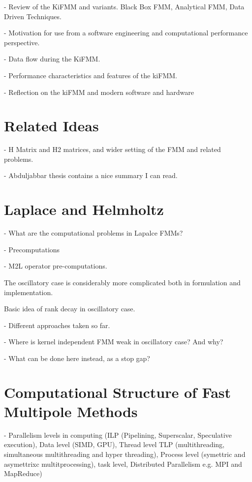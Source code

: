 - Review of the KiFMM and variants. Black Box FMM, Analytical FMM, Data Driven Techniques.

- Motivation for use from a software engineering and computational performance perspective.

- Data flow during the KiFMM.

- Performance characteristics and features of the kiFMM.

- Reflection on the kiFMM and modern software and hardware


\section{Related Ideas}

- H Matrix and H2 matrices, and wider setting of the FMM and related problems.

- Abduljabbar thesis contains a nice summary I can read.




\section{Laplace and Helmholtz}

- What are the computational problems in Lapalce FMMs?

- Precomputations

- M2L operator pre-computations.

The oscillatory case is considerably more complicated both in formulation and implementation.

Basic idea of rank decay in oscillatory case.

- Different approaches taken so far.


- Where is kernel independent FMM weak in oscillatory case? And why?

- What can be done here instead, as a stop gap?




\section{Computational Structure of Fast Multipole Methods}

- Parallelism levels in computing (ILP (Pipelining, Superscalar, Speculative execution), Data level (SIMD, GPU), Thread level TLP (multithreading, simultaneous multithreading and hyper threading), Process level (symettric and asymettrixc multitprocessing), task level, Distributed Parallelism e.g. MPI and MapReduce)

